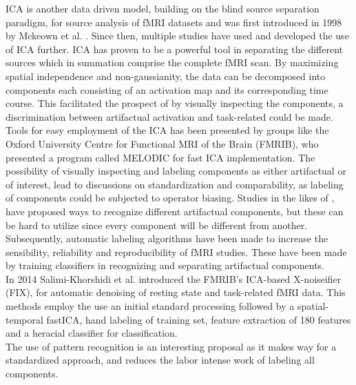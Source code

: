 ICA is another data driven model, building on the blind source separation paradigm, for source analysis of fMRI datasets and was first introduced in 1998 by Mckeown et al. \cite{Mckeown1998}. Since then, multiple studies \cite{Calhoun2001a,Deslauriers2017,Parkes2018,Du2018,Tohka2008} have used and developed the use of ICA further. ICA has proven to be a powerful tool in separating the different sources which in summation comprise the complete fMRI scan. By maximizing spatial independence and non-gaussianity, the data can be decomposed into components each consisting of an activation map and its corresponding time course. \cite{Salimi-Khorshidi2014} This facilitated the prospect of by visually inspecting the components, a discrimination between artifactual activation and task-related could be made. Tools for easy employment of the ICA has been presented by groups like the Oxford University Centre for Functional MRI of the Brain (FMRIB), who presented a program called MELODIC for fast ICA implementation. \cite{FMRIB2016} The possibility of visually inspecting and labeling components as either artifactual or of interest, lead to discussions on standardization and comparability, as labeling of components could be subjected to operator biasing. Studies in the likes of \cite{Salimi-Khorshidi2014,Griffanti2017}, have proposed ways to recognize different artifactual components, but these can be hard to utilize since every component will be different from another. Subsequently, automatic labeling algorithms have been made to increase the sensibility, reliability and reproducibility of fMRI studies. These have been made by training classifiers in recognizing and separating artifactual components. \cite{Tohka2008} \\
In 2014 Salimi-Khorshidi et al. \cite{Salimi-Khorshidi2014} introduced the FMRIB's ICA-based X-noiseifier (FIX), for automatic denoising of resting state and task-related fMRI data. This methods employ the use an initial standard processing followed by a spatial-temporal fastICA, hand labeling of training set, feature extraction of 180 features and a heracial classifier for classification. \cite{Salimi-Khorshidi2014} \\
The use of pattern recognition is an interesting proposal as it makes way for a standardized approach, and reduces the labor intense work of labeling all components.   

